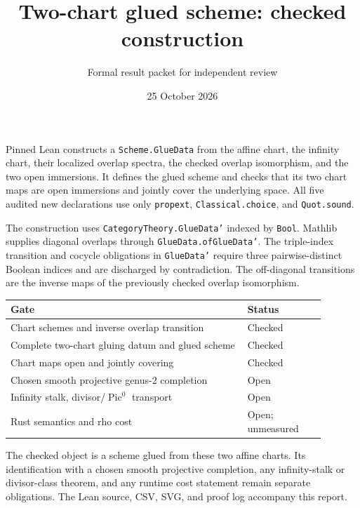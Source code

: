 \documentclass[11pt]{article}
\title{Two-chart glued scheme: checked construction}
\author{Formal result packet for independent review}
\date{25 October 2026}
\begin{document}
\maketitle
Pinned Lean constructs a \texttt{Scheme.GlueData} from the affine chart, the infinity chart, their localized overlap spectra, the checked overlap isomorphism, and the two open immersions. It defines the glued scheme and checks that its two chart maps are open immersions and jointly cover the underlying space. All five audited new declarations use only \texttt{propext}, \texttt{Classical.choice}, and \texttt{Quot.sound}.

The construction uses \texttt{CategoryTheory.GlueData'} indexed by \texttt{Bool}. Mathlib supplies diagonal overlaps through \texttt{GlueData.ofGlueData'}. The triple-index transition and cocycle obligations in \texttt{GlueData'} require three pairwise-distinct Boolean indices and are discharged by contradiction. The off-diagonal transitions are the inverse maps of the previously checked overlap isomorphism.

\begin{center}\begin{tabular}{p{0.67\linewidth}p{0.22\linewidth}}\toprule
Gate & Status\\\midrule
Chart schemes and inverse overlap transition & Checked\\
Complete two-chart gluing datum and glued scheme & Checked\\
Chart maps open and jointly covering & Checked\\
Chosen smooth projective genus-2 completion & Open\\
Infinity stalk, divisor/$\operatorname{Pic}^0$ transport & Open\\
Rust semantics and rho cost & Open; unmeasured\\\bottomrule\end{tabular}\end{center}

The checked object is a scheme glued from these two affine charts. Its identification with a chosen smooth projective completion, any infinity-stalk or divisor-class theorem, and any runtime cost statement remain separate obligations. The Lean source, CSV, SVG, and proof log accompany this report.
\end{document}
